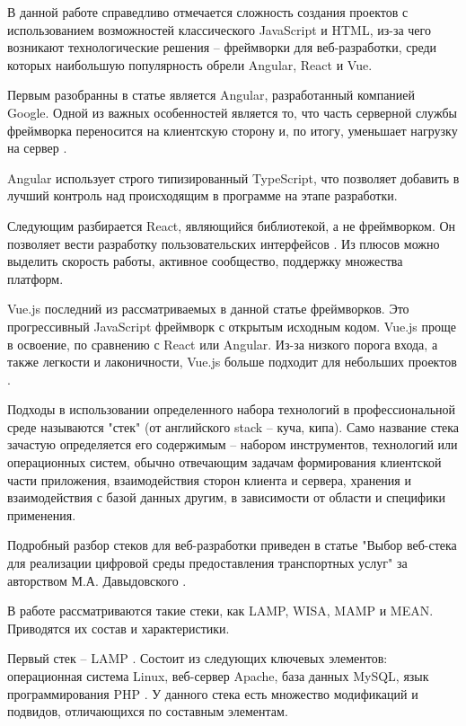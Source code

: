 В данной работе справедливо отмечается сложность создания проектов с использованием возможностей классического JavaScript и HTML, из-за чего возникают технологические решения -- фреймворки для веб-разработки, среди которых наибольшую популярность обрели Angular, React и Vue.

Первым разобранны в статье является Angular, разработанный компанией Google.
Одной из важных особенностей является то, что часть серверной службы фреймворка переносится на клиентскую сторону и, по итогу, уменьшает нагрузку на сервер \cite{sergacheva-framework-1}.

Angular использует строго типизированный TypeScript, что позволяет добавить в лучший контроль над происходящим в программе на этапе разработки.

Следующим разбирается React, являющийся библиотекой, а не фреймворком.
Он позволяет вести разработку пользовательских интерфейсов \cite{sergacheva-framework-2}.
Из плюсов можно выделить скорость работы, активное сообщество, поддержку множества платформ.

Vue.js последний из рассматриваемых в данной статье фреймворков.
Это прогрессивный JavaScript фреймворк с открытым исходным кодом.
Vue.js проще в освоение, по сравнению с React или Angular.
Из-за низкого порога входа, а также легкости и лаконичности, Vue.js больше подходит для небольших проектов \cite{sergacheva-framework-4}.

Подходы в использовании определенного набора технологий в профессиональной среде называются "стек" (от английского stack -- куча, кипа).
Само название стека зачастую определяется его содержимым -- набором инструментов, технологий или операционных систем, обычно отвечающим  задачам формирования клиентской части приложения, взаимодействия сторон клиента и сервера, хранения и взаимодействия с базой данных другим, в зависимости от области и специфики применения.

Подробный разбор стеков для веб-разработки приведен в статье "Выбор веб-стека для реализации цифровой среды предоставления транспортных услуг" за авторством М.А. Давыдовского \cite{davidovsky-vibor}.

В работе рассматриваются такие стеки, как LAMP, WISA, MAMP и MEAN.
Приводятся их состав и характеристики.

Первый стек -- LAMP \cite{davidovsky-vibor-1}.
Состоит из следующих ключевых элементов: операционная система Linux, веб-сервер Apache, база данных MySQL, язык программирования PHP \cite{davidovsky-vibor-php}.
У данного стека есть множество модификаций и подвидов, отличающихся по составным элементам.

